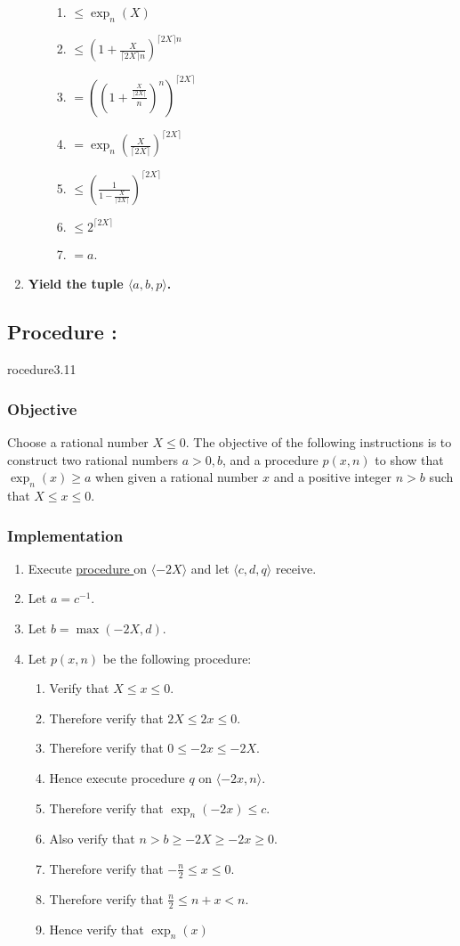 \documentclass{article}
\newcounter{procedure}[part]
\newcommand{\procedure}[1]{\subsection*{Procedure \thepart:\theprocedure}\label{sec:procedure #1}\global\expandafter\edef\csname procedure#1\endcsname{\thepart:\theprocedure}\addtocounter{procedure}{1}}
\newcommand{\objective}{\subsubsection*{Objective}}
\newcommand{\implementation}{\subsubsection*{Implementation}}
\newcommand{\procedurehr}[1]{\hyperref[sec:procedure #1]{procedure \expandafter\csname procedure#1\endcsname}}
\begin{document}
\begin{multicols}{2}
\begin{enumerate}
\begin{enumerate}
						\begin{enumerate}
							\item $\le\exp_n(X)$
							\item $\le(1+\frac{X}{\lceil 2X\rceil n})^{\lceil 2X\rceil n}$
							\item $=((1+\frac{\frac{X}{\lceil 2X\rceil}}{n})^n)^{\lceil 2X\rceil}$
							\item $=\exp_n(\frac{X}{\lceil 2X\rceil})^{\lceil 2X\rceil}$
							\item $\le(\frac{1}{1-\frac{X}{\lceil 2X\rceil}})^{\lceil 2X\rceil}$
							\item $\le 2^{\lceil 2X\rceil}$
							\item $=a$.
						\end{enumerate}
					\end{enumerate}
					\item \textbf{Yield the tuple $\langle a,b,p\rangle$.}
				\end{enumerate}
		\procedure{3.11}
			\objective
				Choose a rational number $X\le 0$. The objective of the following instructions is to construct two rational numbers $a>0,b$, and a procedure $p(x,n)$ to show that $\exp_n(x)\ge a$ when given a rational number $x$ and a positive integer $n>b$ such that $X\le x\le 0$.
			\implementation
				\begin{enumerate}
					\item Execute \procedurehr{3.10} on $\langle -2X\rangle$ and let $\langle c,d,q\rangle$ receive.
					\item Let $a=c^{-1}$.
					\item Let $b=\max(-2X,d)$.
					\item Let $p(x,n)$ be the following procedure:
					\begin{enumerate}
						\item Verify that $X\le x\le 0$.
						\item Therefore verify that $2X\le 2x\le 0$.
						\item Therefore verify that $0\le -2x\le -2X$.
						\item Hence execute procedure $q$ on $\langle -2x,n\rangle$.
						\item Therefore verify that $\exp_n(-2x)\le c$.
						\item Also verify that $n>b\ge -2X\ge -2x\ge 0$.
						\item Therefore verify that $-\frac{n}{2}\le x\le 0$.
						\item Therefore verify that $\frac{n}{2}\le n+x<n$.
						\item Hence verify that $\exp_n(x)$

\end{enumerate}
\end{enumerate}
\end{multicols}
\end{document}

